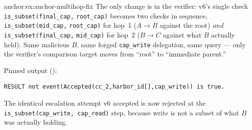 \begin{pdSolution}{anchor:ex:anchor-multihop-fix}
The only change is in the verifier: v6's single check \texttt{is\allowbreak\_subset(final\allowbreak\_cap,} \texttt{root\allowbreak\_cap)} becomes two checks in sequence, \texttt{is\allowbreak\_subset(mid\allowbreak\_cap,} \texttt{root\allowbreak\_cap)} for hop~1 ($A \to B$ against the root) \emph{and} \texttt{is\allowbreak\_subset(final\allowbreak\_cap,} \texttt{mid\allowbreak\_cap)} for hop~2 ($B \to C$ against what $B$ actually held). Same malicious $B$, same forged \texttt{cap\_write} delegation, same query --- only the verifier's comparison target moves from ``root'' to ``immediate parent.''

Pinned output ():
\begin{lstlisting}
RESULT not event(Accepted(cc_2,harbor_id[],cap_write)) is true.
\end{lstlisting}
The identical escalation attempt v6 accepted is now rejected at the \texttt{is\_subset(cap\_write, cap\_read)} step, because write is not a subset of what $B$ was actually holding.
\end{pdSolution}
